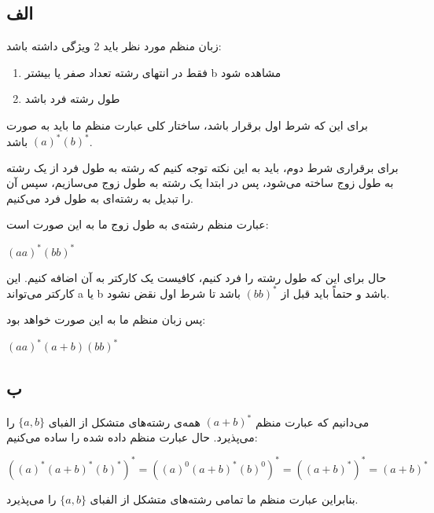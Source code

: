 \subsection*{الف}

زبان منظم مورد نظر باید 2 ویژگی داشته باشد:
\begin{enumerate}
	\item فقط در انتهای رشته تعداد صفر یا بیشتر b مشاهده شود
	\item طول رشته فرد باشد

\end{enumerate}

برای این که شرط اول برقرار باشد، ساختار کلی عبارت منظم ما باید به صورت 
{\large 
$(a)^*(b)^*$
}باشد.

برای برقراری شرط دوم، باید به این نکته توجه کنیم که رشته به طول فرد از یک رشته به طول زوج ساخته می‌شود، پس در ابتدا یک رشته به طول زوج می‌سازیم، سپس آن را تبدیل به رشته‌ای به طول فرد می‌کنیم.

عبارت منظم رشته‌ی به طول زوج ما به این صورت است:

\setLTR

{\large 
	$(aa)^*(bb)^*$
}

\setRTL

حال برای این که طول رشته را فرد کنیم، کافیست یک کارکتر به آن اضافه کنیم. این کارکتر می‌تواند ‌a یا b باشد و حتماً باید قبل از {\large $(bb)^*$} باشد تا شرط اول نقض نشود.

پس زبان منظم ما به این صورت خواهد بود:

\setLTR

	{\large 
		$(aa)^*(a+b)(bb)^*$
	}
\setRTL



\subsection*{ب}

می‌دانیم که عبارت منظم {\large $(a+b)^*$} همه‌ی رشته‌های متشکل از الفبای $\{a,b\}$ را می‌پذیرد. حال عبارت منظم داده شده را ساده می‌کنیم:
\setLTR

{\large 

$((a)^*(a+b)^*(b)^*)^* = ((a)^0(a+b)^*(b)^0)^* = ((a+b)^*)^* = (a+b)^*$

}

\setRTL



بنابراین عبارت منظم ما تمامی رشته‌های متشکل از الفبای $\{a,b\}$ را می‌پذیرد.





